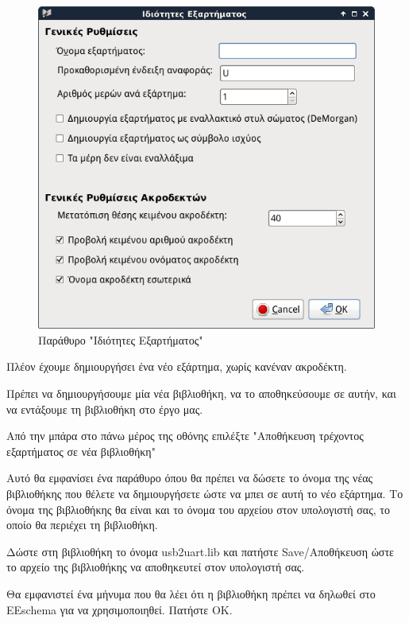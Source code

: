 \documentclass[a4paper]{article}
\begin{document}
\begin{figure}
  \begin{center}
    \includegraphics[width=.9\textwidth]{img/eesch-dial-compprop.png}
    \caption{Παράθυρο "Ιδιότητες Εξαρτήματος"}
    \label{fig:eesch-dial-compprop}
  \end{center}
\end{figure}

Πλέον έχουμε δημιουργήσει ένα νέο εξάρτημα, χωρίς κανέναν ακροδέκτη. 

Πρέπει να δημιουργήσουμε μία νέα βιβλιοθήκη, να το αποθηκεύσουμε σε αυτήν, και να εντάξουμε τη βιβλιοθήκη στο έργο μας.

Από την μπάρα στο πάνω μέρος της οθόνης επιλέξτε "Αποθήκευση τρέχοντος εξαρτήματος σε νέα βιβλιοθήκη" %

Αυτό θα εμφανίσει ένα παράθυρο όπου θα πρέπει να δώσετε το όνομα της νέας βιβλιοθήκης που θέλετε να δημιουργήσετε ώστε να μπει σε αυτή το νέο εξάρτημα. Το όνομα της βιβλιοθήκης θα είναι και το όνομα του αρχείου στον υπολογιστή σας, το οποίο θα περιέχει τη βιβλιοθήκη. 

Δώστε στη βιβλιοθήκη το όνομα \textenglish{usb2uart.lib} και πατήστε Save/Αποθήκευση ώστε το αρχείο της βιβλιοθήκης να αποθηκευτεί στον υπολογιστή σας. 

Θα εμφανιστεί ένα μήνυμα που θα λέει ότι η βιβλιοθήκη πρέπει να δηλωθεί στο \textenglish{EEschema} για να χρησιμοποιηθεί. Πατήστε ΟΚ.
\end{document}
